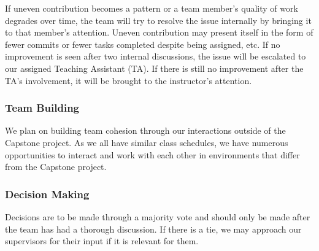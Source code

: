 \documentclass{article}
\begin{document}
If uneven contribution becomes a pattern or a team member’s quality of work degrades
over time, the team will try to resolve the issue internally by bringing it to that
member’s attention. Uneven contribution may present itself in the form of fewer
commits or fewer tasks completed despite being assigned, etc. If no improvement is
seen after two internal discussions, the issue will be escalated to our assigned
Teaching Assistant (TA). If there is still no improvement after the TA's involvement,
it will be brought to the instructor's attention.

\subsubsection*{Team Building}

We plan on building team cohesion through our interactions outside of the Capstone
project. As we all have similar class schedules, we have numerous opportunities to
interact and work with each other in environments that differ from the Capstone
project. 

\subsubsection*{Decision Making} 

Decisions are to be made through a majority vote and should only be made after the
team has had a thorough discussion. If there is a tie, we may approach our
supervisors for their input if it is relevant for them.
\end{document}
